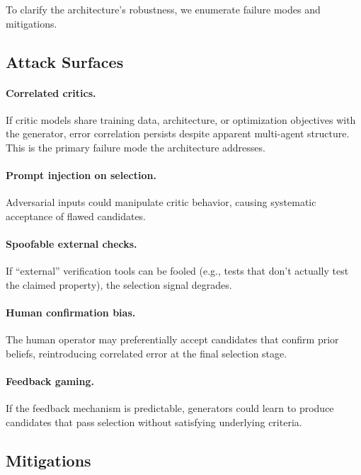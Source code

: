 \documentclass[11pt]{article}
\begin{document}
To clarify the architecture's robustness, we enumerate failure modes and mitigations.

\subsection{Attack Surfaces}

\paragraph{Correlated critics.} If critic models share training data, architecture, or
optimization objectives with the generator, error correlation persists despite apparent
multi-agent structure. This is the primary failure mode the architecture addresses.

\paragraph{Prompt injection on selection.} Adversarial inputs could manipulate critic
behavior, causing systematic acceptance of flawed candidates.

\paragraph{Spoofable external checks.} If ``external'' verification tools can be fooled
(e.g., tests that don't actually test the claimed property), the selection signal degrades.

\paragraph{Human confirmation bias.} The human operator may preferentially accept candidates
that confirm prior beliefs, reintroducing correlated error at the final selection stage.

\paragraph{Feedback gaming.} If the feedback mechanism is predictable, generators could
learn to produce candidates that pass selection without satisfying underlying criteria.

\subsection{Mitigations}
\end{document}
